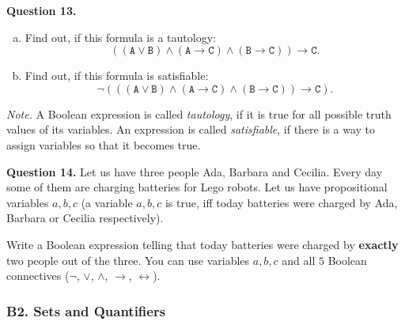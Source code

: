 \documentclass[jou]{apa6}
\begin{document}
\vspace{6pt}
{\bf Question 13.} 
\begin{enumerate}[(a)]
\item Find out, if this formula is a tautology: 
$$\mathtt{((A \vee B) \wedge (A \rightarrow C) \wedge 
(B \rightarrow C)) \rightarrow C}.$$
\item Find out, if this formula is satisfiable: 
$$\mathtt{\neg (((A \vee B) \wedge (A \rightarrow C) \wedge 
(B \rightarrow C)) \rightarrow C)}.$$
\end{enumerate}

{\em Note.} A Boolean expression is called {\em tautology}, 
if it is true for all 
possible truth values of its variables. 
An expression is called {\em satisfiable}, 
if there is a way to assign 
variables so that it becomes true. 

\vspace{6pt}
{\bf Question 14.} 
Let us have three people \textendash{} Ada, Barbara and Cecilia. 
Every day some of them are charging batteries for Lego robots.
Let us have propositional variables $a,b,c$ (a variable $a,b,c$ is true, iff 
today batteries were charged by Ada, Barbara or Cecilia respectively). 

Write a Boolean expression telling that today batteries were charged
by {\bf exactly} two people out of the three. You can use variables $a,b,c$ and
all $5$ Boolean connectives ($\neg$, $\vee$, $\wedge$, $\rightarrow$, 
$\leftrightarrow$). 



\subsubsection{B2. Sets and Quantifiers}
\end{document}
